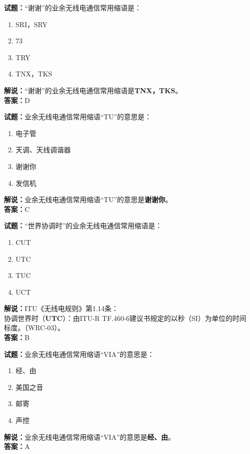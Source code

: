 \documentclass{ctexbook}
\begin{document}
\vspace{1em}

\textbf{试题：}“谢谢”的业余无线电通信常用缩语是：
\begin{enumerate}[leftmargin=3em]
  \item SRI，SRY
  \item 73
  \item TRY
  \item TNX，TKS
\end{enumerate}
\noindent\textbf{解说：}“谢谢”的业余无线电通信常用缩语是\textbf{TNX，TKS}。\\\noindent\textbf{答案：}D

\vspace{1em}

\textbf{试题：}业余无线电通信常用缩语“TU”的意思是：
\begin{enumerate}[leftmargin=3em]
  \item 电子管
  \item 天调、天线调谐器
  \item 谢谢你
  \item 发信机
\end{enumerate}
\noindent\textbf{解说：}业余无线电通信常用缩语“TU”的意思是\textbf{谢谢你}。\\\noindent\textbf{答案：}C

\vspace{1em}

\textbf{试题：}“世界协调时”的业余无线电通信常用缩语是：
\begin{enumerate}[leftmargin=3em]
  \item CUT
  \item UTC
  \item TUC
  \item UCT
\end{enumerate}
\noindent\textbf{解说：}ITU《无线电规则》第1.14条：\\协调世界时（\textbf{UTC}）：由ITU-R TF.460-6建议书规定的以秒（SI）为单位的时间标度。（WRC-03）。\\\noindent\textbf{答案：}B

\vspace{1em}

\textbf{试题：}业余无线电通信常用缩语“VIA”的意思是：
\begin{enumerate}[leftmargin=3em]
  \item 经、由
  \item 美国之音%
  \item 邮寄
  \item 声控
\end{enumerate}
\noindent\textbf{解说：}业余无线电通信常用缩语“VIA”的意思是\textbf{经、由}。\\\noindent\textbf{答案：}A
\end{document}
